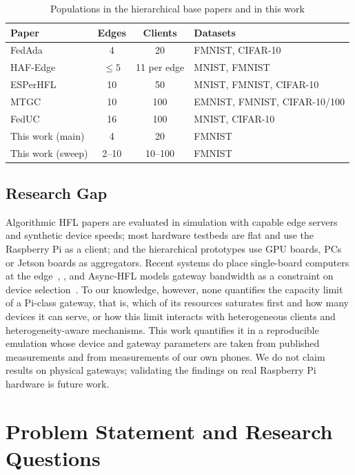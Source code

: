 \documentclass[conference]{IEEEtran}
\begin{document}
\begin{table}[t]
\centering
\caption{Populations in the hierarchical base papers and in this work}
\label{tab:counts}
\footnotesize
\setlength{\tabcolsep}{2.5pt}
\begin{tabular}{@{}lccl@{}}
\toprule
\textbf{Paper} & \textbf{Edges} & \textbf{Clients} & \textbf{Datasets} \\
\midrule
FedAda~\cite{luo2024} & 4 & 20 & FMNIST, CIFAR-10 \\
HAF-Edge~\cite{gao2024} & $\le 5$ & 11 per edge & MNIST, FMNIST \\
ESPerHFL~\cite{ma2024esper} & 10 & 50 & MNIST, FMNIST, CIFAR-10 \\
MTGC~\cite{fang2024mtgc} & 10 & 100 & EMNIST, FMNIST, CIFAR-10/100 \\
FedUC~\cite{ma2024feduc} & 16 & 100 & MNIST, CIFAR-10 \\
\midrule
This work (main) & 4 & 20 & FMNIST \\
This work (sweep) & 2--10 & 10--100 & FMNIST \\
\bottomrule
\end{tabular}
\end{table}

\subsection{Research Gap}
Algorithmic HFL papers are evaluated in simulation with capable edge servers and synthetic device speeds; most hardware testbeds are flat and use the Raspberry Pi as a client; and the hierarchical prototypes use GPU boards, PCs or Jetson boards as aggregators. Recent systems do place single-board computers at the edge~\cite{ramalingam2026hflgai}, \cite{chaudhary2025innetwork}, and Async-HFL models gateway bandwidth as a constraint on device selection~\cite{yu2023asynchfl}. To our knowledge, however, none quantifies the capacity limit of a Pi-class gateway, that is, which of its resources saturates first and how many devices it can serve, or how this limit interacts with heterogeneous clients and heterogeneity-aware mechanisms. This work quantifies it in a reproducible emulation whose device and gateway parameters are taken from published measurements and from measurements of our own phones. We do not claim results on physical gateways; validating the findings on real Raspberry Pi hardware is future work.

\section{Problem Statement and Research Questions}
\label{sec:problem}
\end{document}
